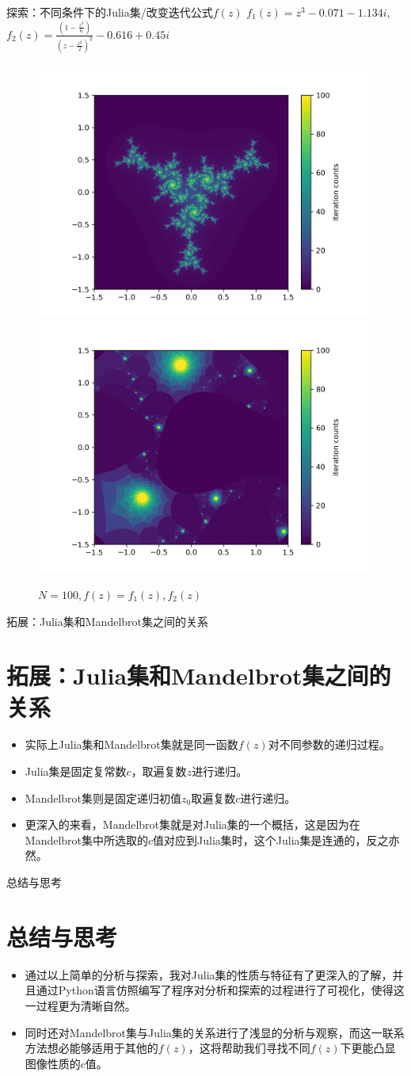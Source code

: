 \documentclass{beamer}
\begin{document}
\begin{frame}{探索：不同条件下的Julia集/改变迭代公式$f(z)$}
	$f_1(z)=z^3-0.071-1.134i$,\\$\displaystyle f_2(z)=\frac{(1-\frac{z^3}{6})}{(z-\frac{z^2}{2})^2}-0.616+0.45i$
\begin{figure}[H]
	\includegraphics[width=.45\textwidth]{../png/300dpi/julia_f1_N100.png}
	\includegraphics[width=.45\textwidth]{../png/300dpi/julia_f2_N100.png}
	\caption{$N=100,f(z)=f_1(z),f_2(z)$}
\end{figure}
\end{frame}

\begin{frame}{拓展：Julia集和Mandelbrot集之间的关系}
\section{拓展：Julia集和Mandelbrot集之间的关系}
\begin{itemize}
\item 实际上Julia集和Mandelbrot集就是同一函数$f(z)$对不同参数的递归过程。
\item Julia集是固定复常数$c$，取遍复数$z$进行递归。
\item Mandelbrot集则是固定递归初值$z_0$取遍复数$c$进行递归。
\item 更深入的来看，Mandelbrot集就是对Julia集的一个概括，这是因为在Mandelbrot集中所选取的$c$值对应到Julia集时，这个Julia集是连通的，反之亦然。
\end{itemize}
\end{frame}

\begin{frame}{总结与思考}
\section{总结与思考}
\begin{itemize}
\item 通过以上简单的分析与探索，我对Julia集的性质与特征有了更深入的了解，并且通过Python语言仿照编写了程序对分析和探索的过程进行了可视化，使得这一过程更为清晰自然。
\item 同时还对Mandelbrot集与Julia集的关系进行了浅显的分析与观察，而这一联系方法想必能够适用于其他的$f(z)$，这将帮助我们寻找不同$f(z)$下更能凸显图像性质的$c$值。
\end{itemize}
\end{frame}
\end{document}
